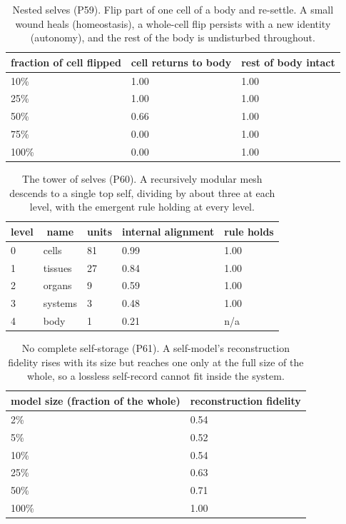 \begin{table}[H]
\centering
\small
\begin{tabular}{lll}
\toprule
\multicolumn{1}{c}{fraction of cell flipped} & \multicolumn{1}{c}{cell returns to body} & \multicolumn{1}{c}{rest of body intact} \\
\midrule
10\% & 1.00 & 1.00 \\
25\% & 1.00 & 1.00 \\
50\% & 0.66 & 1.00 \\
75\% & 0.00 & 1.00 \\
100\% & 0.00 & 1.00 \\
\bottomrule
\end{tabular}
\caption{Nested selves (P59). Flip part of one cell of a body and re-settle. A small wound heals (homeostasis), a whole-cell flip persists with a new identity (autonomy), and the rest of the body is undisturbed throughout.}
\end{table}

\begin{table}[H]
\centering
\small
\begin{tabular}{lllll}
\toprule
\multicolumn{1}{c}{level} & \multicolumn{1}{c}{name} & \multicolumn{1}{c}{units} & \multicolumn{1}{c}{internal alignment} & \multicolumn{1}{c}{rule holds} \\
\midrule
0 & cells & 81 & 0.99 & 1.00 \\
1 & tissues & 27 & 0.84 & 1.00 \\
2 & organs & 9 & 0.59 & 1.00 \\
3 & systems & 3 & 0.48 & 1.00 \\
4 & body & 1 & 0.21 & n/a \\
\bottomrule
\end{tabular}
\caption{The tower of selves (P60). A recursively modular mesh descends to a single top self, dividing by about three at each level, with the emergent rule holding at every level.}
\end{table}

\begin{table}[H]
\centering
\small
\begin{tabular}{ll}
\toprule
\multicolumn{1}{c}{model size (fraction of the whole)} & \multicolumn{1}{c}{reconstruction fidelity} \\
\midrule
2\% & 0.54 \\
5\% & 0.52 \\
10\% & 0.54 \\
25\% & 0.63 \\
50\% & 0.71 \\
100\% & 1.00 \\
\bottomrule
\end{tabular}
\caption{No complete self-storage (P61). A self-model's reconstruction fidelity rises with its size but reaches one only at the full size of the whole, so a lossless self-record cannot fit inside the system.}
\end{table}


